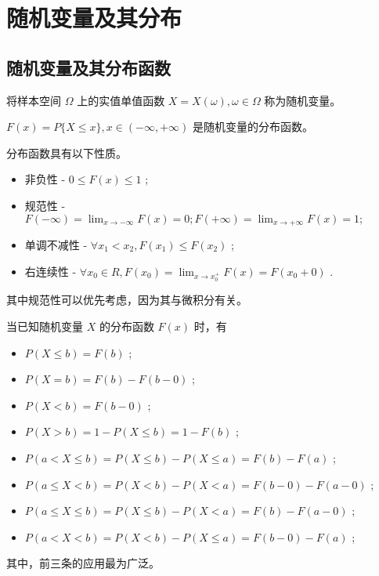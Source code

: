 \chapter{随机变量及其分布}

\section{随机变量及其分布函数}

将样本空间 $ \Omega $ 上的实值单值函数 $ X = X(\omega),\omega \in \Omega $ 
称为随机变量。

$ F(x) = P\{X\leq x\},x\in (-\infty,+\infty) $ 是随机变量的分布函数。

分布函数具有以下性质。
\begin{itemize}
    \item 非负性 - $ 0\leq F(x)\leq 1 $ ;
    \item 规范性 - $ F(-\infty) = {\displaystyle\lim_{x\rightarrow -\infty}}F(x) = 0;
    F(+\infty) = {\displaystyle\lim_{x\rightarrow +\infty}}F(x) = 1; $ 
    \item 单调不减性 - $ \forall x_1 < x_2, F(x_1)\leq F(x_2) $ ;
    \item 右连续性 - $ \forall x_0 \in R, F(x_0)={\displaystyle\lim_{x\rightarrow x_0^+}}F(x) = F(x_0+0) $ .
\end{itemize}

其中规范性可以优先考虑，因为其与微积分有关。

当已知随机变量 $ X $ 的分布函数 $ F(x) $ 时，有
\begin{itemize}
    \item $ P(X\leq b) = F(b) $ ;
    \item $ P(X = b) = F(b) - F(b-0)$ ;
    \item $ P(X < b) = F(b-0) $ ;
    \item $ P(X > b) = 1 - P(X \leq b) = 1 - F(b) $ ;
    \item $ P(a < X \leq b) = P(X\leq b) - P(X\leq a) = F(b) - F(a) $ ;
    \item $ P(a \leq X < b) = P(X < b) - P(X < a) = F(b-0) - F(a-0) $ ;
    \item $ P(a \leq X \leq b) = P(X\leq b) - P(X < a) = F(b) - F(a-0) $ ;
    \item $ P(a < X < b) = P(X < b) - P(X \leq a) = F(b-0) - F(a) $ ;
\end{itemize}

其中，前三条的应用最为广泛。


